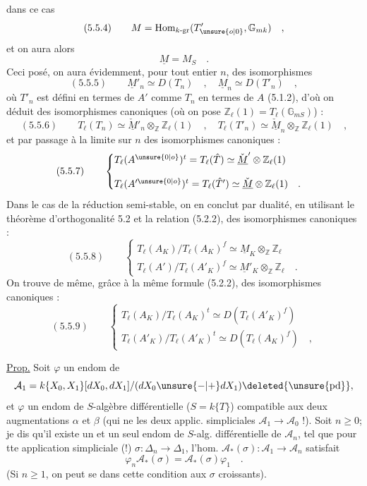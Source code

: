 dans ce cas
\[
(5.5.4)\qquad M=\operatorname{Hom}_{k\text{-gr}}(T'_{\unsure{o|0}},\mathbb G_{mk})\quad,
\]
et on aura alors
\[
\underline M=M_S\quad.
\]
Ceci posé, on aura évidemment, pour tout entier $n$, des isomorphismes
\[
(5.5.5)\qquad\underline M'_n\simeq D(T_n)\quad,\quad\underline M_n\simeq D(T'_n)\quad,
\]
où $T'_n$ est défini en termes de $A'$ comme $T_n$ en termes de $A$ (5.1.2), d'où on déduit des isomorphismes canoniques (où on pose $\mathbb Z_\ell(1)=T_\ell(\mathbb G_{mS})$) :
\[
(5.5.6)\qquad T_\ell(T_n)\simeq\check{\underline M}'_n\otimes_{\mathbb Z}\mathbb Z_\ell(1)\quad,\quad T_\ell(T'_n)\simeq\check{\underline M}_n\otimes_{\mathbb Z}\mathbb Z_\ell(1)\quad,
\]
et par passage à la limite sur $n$ des isomorphismes canoniques :
\[
(5.5.7)\qquad\begin{cases}
T_\ell(A^{\unsure{0|o}})^t=T_\ell(\hat T)\simeq\check{\underline M}'\otimes\mathbb Z_\ell(1)\\[1em]
T_\ell(A'^{\unsure{0|o}})^t=T_\ell(\hat T')\simeq\check{\underline M}\otimes\mathbb Z_\ell(1)\quad.
\end{cases}
\]
Dans le cas de la réduction semi-stable, on en conclut par dualité, en utilisant le théorème d'orthogonalité 5.2 et la relation (5.2.2), des isomorphismes canoniques :
\[
(5.5.8)\qquad\begin{cases}
T_\ell(A_K)/T_\ell(A_K)^f\simeq\underline M_K\otimes_{\mathbb Z}\mathbb Z_\ell\\[1em]
T_\ell(A')/T_\ell(A'_K)^f\simeq\underline M'_K\otimes_{\mathbb Z}\mathbb Z_\ell\quad.
\end{cases}
\]
On trouve de même, grâce à la même formule (5.2.2), des isomorphismes canoniques :
\[
(5.5.9)\qquad\begin{cases}
T_\ell(A_K)/T_\ell(A_K)^t\simeq D(T_\ell(A'_K)^f)\\[1em]
T_\ell(A'_K)/T_\ell(A'_K)^t\simeq D(T_\ell(A_K)^f)\quad,
\end{cases}
\]

\uline{Prop.} Soit $\varphi$ un endom de
\[
\mathcal A_1=k\{X_0,X_1\}[dX_0,dX_1]/(dX_0\unsure{-|+}dX_1)\deleted{\unsure{\mathrm{pd}}},
\]
et $\varphi$ \deleted{$\unsure{\varphi}$} un endom de $S$-algèbre différentielle ($S=k\{T\}$) compatible aux deux augmentations $\alpha$ et $\beta$ (qui ne  les deux applic. simpliciales $\mathcal A_1\longrightarrow\mathcal A_0$ !). Soit $n\ge0$; je dis qu'il existe un et un seul endom de $S$-alg. différentielle de $\mathcal A_n$,  tel que pour tte application simpliciale (!) $\sigma:\Delta_n\longrightarrow\Delta_1$, l'hom. $\mathcal A_*(\sigma):\mathcal A_1\to\mathcal A_n$ satisfait
\[
\varphi_n\mathcal A_*(\sigma)=\mathcal A_*(\sigma)\varphi_1\quad.
\]
 (Si $n\ge1$, on peut se   dans cette condition aux $\sigma$ croissants).

